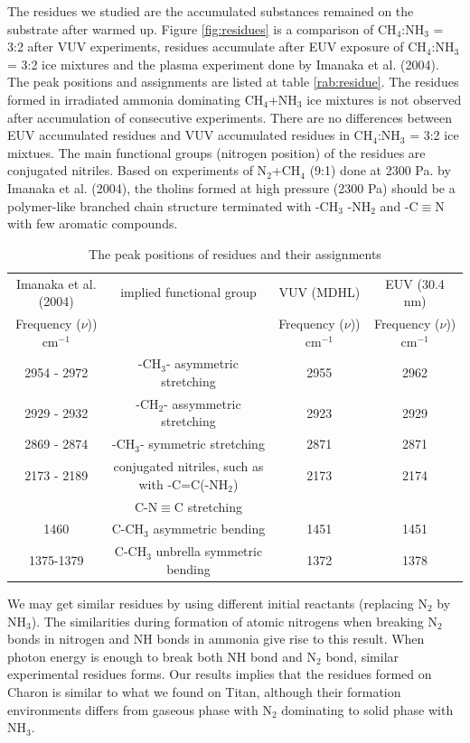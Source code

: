 The residues we studied are the accumulated substances remained on the substrate after warmed up. Figure \ref{fig:residues} is a comparison of CH$_4$:NH$_3$ = 3:2 after VUV experiments, residues accumulate after EUV exposure of CH$_4$:NH$_3$ = 3:2 ice mixtures and the plasma experiment done by Imanaka et al. (2004)\cite{imanaka2004laboratory}. The peak positions and assignments are listed at table \ref{rab:residue}. The residues formed in irradiated ammonia dominating CH$_4$+NH$_3$ ice mixtures is not observed after accumulation of consecutive experiments. There are no differences between EUV accumulated residues and VUV accumulated residues in CH$_4$:NH$_3$ = 3:2 ice mixtues. The main functional groups (nitrogen position) of the residues are conjugated nitriles. Based on experiments of N$_2$+CH$_4$ (9:1) done at 2300 Pa. by Imanaka et al. (2004)\cite{imanaka2004laboratory}, the tholins formed at high pressure (2300 Pa) should be a polymer-like branched chain structure terminated with -CH$_3$ -NH$_2$ and -C$\equiv$N with few aromatic compounds.\\

\begin{table}[htbp]
\caption{The peak positions of residues and their assignments}
\label{tab:residue}
\begin{tabular}{cccc}
\hline
\hline
Imanaka et al. (2004) & implied functional group & VUV (MDHL) & EUV (30.4 nm)\\
Frequency ($\nu$))  cm$^{-1}$ & & Frequency ($\nu$))  cm$^{-1}$ & Frequency ($\nu$)) cm$^{-1}$ \\
\hline
2954 - 2972 & -CH$_3$- asymmetric stretching & 2955 & 2962 \\
2929 - 2932 & -CH$_2$- assymmetric stretching & 2923 & 2929 \\
2869 - 2874 & -CH$_3$- symmetric stretching & 2871 & 2871 \\
2173 - 2189 & conjugated nitriles, such as with -C=C(-NH$_2$)& 2173 & 2174 \\
 & C-N$\equiv$C stretching& & \\
1460 & C-CH$_3$ asymmetric bending & 1451 & 1451 \\
1375-1379 & C-CH$_3$ unbrella symmetric bending & 1372 & 1378 \\
\hline
\end{tabular}
\end{table}

We may get similar residues by using different initial reactants (replacing N$_2$ by NH$_3$). The similarities during formation of atomic nitrogens when breaking N$_2$ bonds in nitrogen and NH bonds in ammonia give rise to this result. When photon energy is enough to break both NH bond and N$_2$ bond, similar experimental residues forms. Our results implies that the residues formed on Charon is similar to what we found on Titan, although their formation environments differs from gaseous phase with N$_2$ dominating to solid phase with NH$_3$.\\

